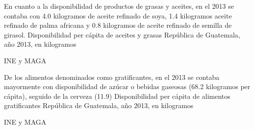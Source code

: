 
%
{%
En cuanto a la disponibilidad de productos de grasas y aceites, en el 2013 se contaba con 4.0 kilogramos de aceite refinado de soya, 1.4 kilogramos aceite refinado de palma africana y 0.8 kilogramos de aceite refinado de semilla de girasol.}%
{%
	Disponibilidad per cápita de aceites y grasas} %
{%
	República de Guatemala, año 2013, en kilogramos } %
{%
	\begin{tikzpicture}[x=1pt,y=1pt]    \end{tikzpicture}}%
{%
	INE y MAGA} %


%
{%
De los alimentos denominados como gratificantes, en el 2013 se contaba mayormente con disponibilidad de azúcar o bebidas gaseosas (68.2 kilogramos per cápita), seguido de la cerveza (11.9)}%
{%
	Disponibilidad per cápita de alimentos gratificantes} %
{%
	República de Guatemala, año 2013, en kilogramos } %
{%
	\begin{tikzpicture}[x=1pt,y=1pt]    \end{tikzpicture}}%
{%
	INE y MAGA} %